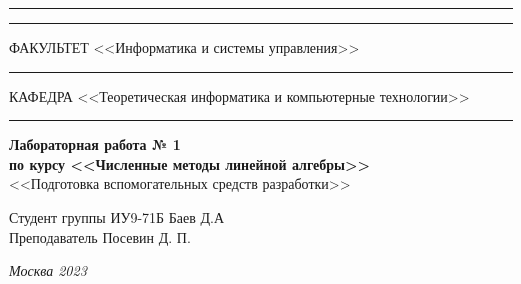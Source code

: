 \documentclass[a4paper, 14pt]{extarticle}
\begin{document}
\begin{titlepage}
\vspace{-25pt}
\hspace{-35pt}\rule{\textwidth}{2.3pt}

\vspace*{-20.3pt}
\hspace{-35pt}\rule{\textwidth}{0.4pt}

\vspace{1.5ex}
\hspace{-35pt} \noindent \small ФАКУЛЬТЕТ\hspace{80pt} <<Информатика и системы управления>>

\vspace*{-16pt}
\hspace{47pt}\rule{0.83\textwidth}{0.4pt}

\vspace{0.5ex}
\hspace{-35pt} \noindent \small КАФЕДРА\hspace{50pt} <<Теоретическая информатика и компьютерные технологии>>

\vspace*{-16pt}
\hspace{30pt}\rule{0.866\textwidth}{0.4pt}

\vspace{11em}

\begin{center}
\Large {\bf Лабораторная работа № 1} \\
\large {\bf по курсу <<Численные методы линейной алгебры>>} \\
\large <<Подготовка вспомогательных средств разработки>>
\end{center}\normalsize

\vspace{8em}


\begin{flushright}
  {Студент группы ИУ9-71Б Баев Д.А \hspace*{15pt}\\
  \vspace{2ex}
  Преподаватель Посевин Д. П.\hspace*{15pt}}
\end{flushright}

\bigskip

\vfill


\begin{center}
\textsl{Москва 2023}
\end{center}
\end{titlepage}
\end{document}
